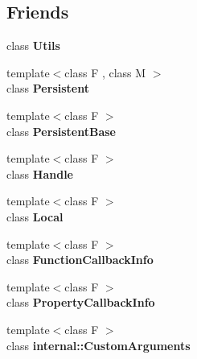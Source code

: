 \subsection*{Friends}
\begin{DoxyCompactItemize}
\item 
\hypertarget{classv8_1_1_handle_abc0f7da619e9e72510dc07ed7b5ff6d8}{}class {\bfseries Utils}\label{classv8_1_1_handle_abc0f7da619e9e72510dc07ed7b5ff6d8}

\item 
\hypertarget{classv8_1_1_handle_ad845ec8872174be0a9ca9a3dd1898d30}{}{\footnotesize template$<$class F , class M $>$ }\\class {\bfseries Persistent}\label{classv8_1_1_handle_ad845ec8872174be0a9ca9a3dd1898d30}

\item 
\hypertarget{classv8_1_1_handle_abb172e0bb22fc5fed7a3a66f29d046ce}{}{\footnotesize template$<$class F $>$ }\\class {\bfseries Persistent\+Base}\label{classv8_1_1_handle_abb172e0bb22fc5fed7a3a66f29d046ce}

\item 
\hypertarget{classv8_1_1_handle_a67ca1a2d91273eaf85fb3d23ba8ce984}{}{\footnotesize template$<$class F $>$ }\\class {\bfseries Handle}\label{classv8_1_1_handle_a67ca1a2d91273eaf85fb3d23ba8ce984}

\item 
\hypertarget{classv8_1_1_handle_afb872edb4aac7ba55f0da004113aa2b0}{}{\footnotesize template$<$class F $>$ }\\class {\bfseries Local}\label{classv8_1_1_handle_afb872edb4aac7ba55f0da004113aa2b0}

\item 
\hypertarget{classv8_1_1_handle_a76786e6fa2d0eac5e2d4f647659d0d23}{}{\footnotesize template$<$class F $>$ }\\class {\bfseries Function\+Callback\+Info}\label{classv8_1_1_handle_a76786e6fa2d0eac5e2d4f647659d0d23}

\item 
\hypertarget{classv8_1_1_handle_a5018adab21fade2b42f4f60e45fa1083}{}{\footnotesize template$<$class F $>$ }\\class {\bfseries Property\+Callback\+Info}\label{classv8_1_1_handle_a5018adab21fade2b42f4f60e45fa1083}

\item 
\hypertarget{classv8_1_1_handle_a07108678a2af25caab612879ed7dca62}{}{\footnotesize template$<$class F $>$ }\\class {\bfseries internal\+::\+Custom\+Arguments}\label{classv8_1_1_handle_a07108678a2af25caab612879ed7dca62}


\end{DoxyCompactItemize}
